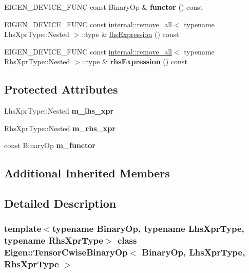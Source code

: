 \begin{DoxyCompactItemize}
E\+I\+G\+E\+N\+\_\+\+D\+E\+V\+I\+C\+E\+\_\+\+F\+U\+NC const Binary\+Op \& {\bfseries functor} () const
\item 
E\+I\+G\+E\+N\+\_\+\+D\+E\+V\+I\+C\+E\+\_\+\+F\+U\+NC const \hyperlink{struct_eigen_1_1internal_1_1remove__all}{internal\+::remove\+\_\+all}$<$ typename Lhs\+Xpr\+Type\+::\+Nested $>$\+::type \& \hyperlink{class_eigen_1_1_tensor_cwise_binary_op_abe293a3a1ee663b55c0363d2fb751397}{lhs\+Expression} () const
\item 
\mbox{\label{class_eigen_1_1_tensor_cwise_binary_op_acfdb103c33af9a665974c3b65b996da2}} 
E\+I\+G\+E\+N\+\_\+\+D\+E\+V\+I\+C\+E\+\_\+\+F\+U\+NC const \hyperlink{struct_eigen_1_1internal_1_1remove__all}{internal\+::remove\+\_\+all}$<$ typename Rhs\+Xpr\+Type\+::\+Nested $>$\+::type \& {\bfseries rhs\+Expression} () const
\end{DoxyCompactItemize}
\subsection*{Protected Attributes}
\begin{DoxyCompactItemize}
\item 
\mbox{\label{class_eigen_1_1_tensor_cwise_binary_op_ac80a9ec240219448ef501a512002e236}} 
Lhs\+Xpr\+Type\+::\+Nested {\bfseries m\+\_\+lhs\+\_\+xpr}
\item 
\mbox{\label{class_eigen_1_1_tensor_cwise_binary_op_a34e82cd0d00c6fb97ffdfdc62643beac}} 
Rhs\+Xpr\+Type\+::\+Nested {\bfseries m\+\_\+rhs\+\_\+xpr}
\item 
\mbox{\label{class_eigen_1_1_tensor_cwise_binary_op_a41988d774c5f25b38ba20a69dc5749a5}} 
const Binary\+Op {\bfseries m\+\_\+functor}
\end{DoxyCompactItemize}
\subsection*{Additional Inherited Members}


\subsection{Detailed Description}
\subsubsection*{template$<$typename Binary\+Op, typename Lhs\+Xpr\+Type, typename Rhs\+Xpr\+Type$>$\newline
class Eigen\+::\+Tensor\+Cwise\+Binary\+Op$<$ Binary\+Op, Lhs\+Xpr\+Type, Rhs\+Xpr\+Type $>$}



